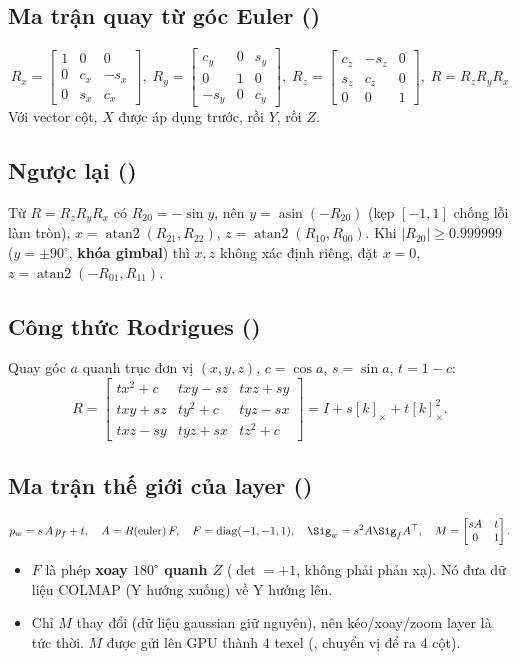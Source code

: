 \subsection{Ma trận quay từ góc Euler ()}
\[
R_x=\begin{bmatrix}1&0&0\\0&c_x&-s_x\\0&s_x&c_x\end{bmatrix},\;
R_y=\begin{bmatrix}c_y&0&s_y\\0&1&0\\-s_y&0&c_y\end{bmatrix},\;
R_z=\begin{bmatrix}c_z&-s_z&0\\s_z&c_z&0\\0&0&1\end{bmatrix},\;
R=R_zR_yR_x
\]
Với vector cột, $X$ được áp dụng trước, rồi $Y$, rồi $Z$.

\subsection{Ngược lại ()}
Từ $R=R_zR_yR_x$ có $R_{20}=-\sin y$, nên $y=\operatorname{asin}(-R_{20})$ (kẹp $[-1,1]$ chống lỗi làm tròn), $x=\operatorname{atan2}(R_{21},R_{22})$, $z=\operatorname{atan2}(R_{10},R_{00})$. Khi $|R_{20}|\ge0.999999$ ($y=\pm90^\circ$, \textbf{khóa gimbal}) thì $x,z$ không xác định riêng, đặt $x=0$, $z=\operatorname{atan2}(-R_{01},R_{11})$.

\subsection{Công thức Rodrigues ()}
Quay góc $a$ quanh trục đơn vị $(x,y,z)$, $c=\cos a$, $s=\sin a$, $t=1-c$:
\[
R=\begin{bmatrix}tx^2+c & txy-sz & txz+sy\\ txy+sz & ty^2+c & tyz-sx\\ txz-sy & tyz+sx & tz^2+c\end{bmatrix}
= I + s[k]_\times + t[k]_\times^2 .
\]

\subsection{Ma trận thế giới của layer ()}
\[
p_w = s\,A\,p_f + t,\quad A=R(\mathrm{euler})\,F,\quad F=\mathrm{diag}(-1,-1,1),\quad
\Sig_w = s^2 A\Sig_f A^{\top},\quad
M=\begin{bmatrix}sA & t\\ 0 & 1\end{bmatrix}.
\]
\begin{itemize}
\item $F$ là phép \textbf{xoay $180^\circ$ quanh $Z$} ($\det=+1$, không phải phản xạ). Nó đưa dữ liệu COLMAP (Y hướng xuống) về Y hướng lên.
\item Chỉ $M$ thay đổi (dữ liệu gaussian giữ nguyên), nên kéo/xoay/zoom layer là tức thời. $M$ được gửi lên GPU thành 4 texel (, chuyển vị để ra 4 cột).
\end{itemize}

